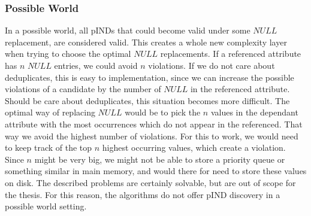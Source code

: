 \subsubsection*{Possible World}
In a possible world, all pINDs that could become valid under some $NULL$ replacement, are considered valid. This creates a whole new complexity layer when trying to choose the optimal $NULL$ replacements. If a referenced attribute has $n$ $NULL$ entries, we could avoid $n$ violations. If we do not care about deduplicates, this is easy to implementation, since we can increase the possible violations of a candidate by the number of $NULL$ in the referenced attribute. Should be care about deduplicates, this situation becomes more difficult. The optimal way of replacing $NULL$ would be to pick the $n$ values in the dependant attribute with the most occurrences which do not appear in the referenced. That way we avoid the highest number of violations. For this to work, we would need to keep track of the top $n$ highest occurring values, which create a violation. Since $n$ might be very big, we might not be able to store a priority queue or something similar in main memory, and would there for need to store these values on disk. The described problems are certainly solvable, but are out of scope for the thesis. For this reason, the algorithms do not offer pIND discovery in a possible world setting.